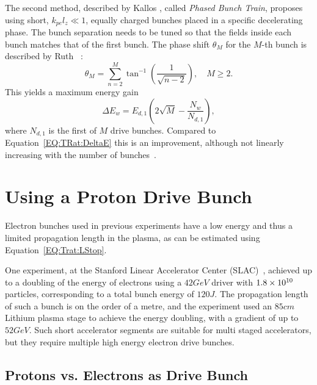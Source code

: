The second method, described by Kallos \etal, called \textit{Phased Bunch Train}, proposes using short, $k_{pe}l_{z} \ll 1$, equally charged bunches placed in a specific decelerating phase.
The bunch separation needs to be tuned so that the fields inside each bunch matches that of the first bunch.
The phase shift $\theta_{M}$ for the $M$-th bunch is described by Ruth \etal~\cite{ruth:1985}:
\begin{equation}
    \theta_{M} = \sum^{M}_{n=2}\tan^{-1}\left(\frac{1}{\sqrt{n-2}}\right),\quad M \geq 2. \label{EQ:TrainPhase}
\end{equation}
This yields a maximum energy gain
\begin{equation}
    \Delta E_{w} = E_{d,1}\left(2\sqrt{M}-\frac{N_{w}}{N_{d,1}}\right), \label{EQ:TrainPhaseMaxE}
\end{equation}
where $N_{d,1}$ is the first of $M$ drive bunches.
Compared to Equation~\ref{EQ:TRat:DeltaE} this is an improvement, although not linearly increasing with the number of bunches~\cite{ruth:1985}.

\section{Using a Proton Drive Bunch}
\label{Int:DBeam}

Electron bunches used in previous experiments have a low energy and thus a limited propagation length in the plasma, as can be estimated using Equation~\ref{EQ:Trat:LStop}.

One experiment, at the Stanford Linear Accelerator Center (SLAC)~\cite{blumenfeld:2007}, achieved up to a doubling of the energy of electrons using a $42\unit{GeV}$ driver with $1.8\times 10^{10}$ particles, corresponding to a total bunch energy of $120\unit{J}$.
The propagation length of such a bunch is on the order of a metre, and the experiment used an $85\unit{cm}$ Lithium plasma stage to achieve the energy doubling, with a gradient of up to $52\unit{GeV}$.
Such short accelerator segments are suitable for multi staged accelerators, but they require multiple high energy electron drive bunches. 

\subsection{Protons vs. Electrons as Drive Bunch}
\label{Int:DBeam:PDPWFA}

